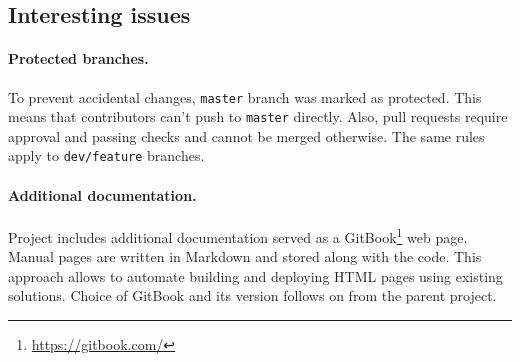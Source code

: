 \subsection{Interesting issues}

\paragraph{Protected branches.}
To prevent accidental changes, \texttt{master} branch was marked as protected.
This means that contributors can't push to \texttt{master} directly.
Also, pull requests require approval and passing checks and cannot be merged otherwise.
The same rules apply to \texttt{dev/feature} branches.

\paragraph{Additional documentation.}
Project includes additional documentation served as a GitBook\footnote{\href{https://gitbook.com/}{https://gitbook.com/}} web page.
Manual pages are written in Markdown and stored along with the code.
This approach allows to automate building and deploying HTML pages using existing solutions.
Choice of GitBook and its version follows on from the parent project.
